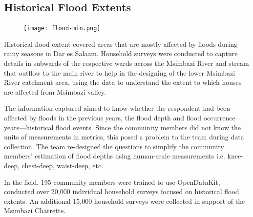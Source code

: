 \documentclass[a4paper,12pt,twoside]{article}
\begin{document}

\newpage
\subsection{Historical Flood Extents}
\begin{figure}[h]
    \centering
    \texttt{[image: flood-min.png]}
    \label{fig:my_label}
\end{figure}

\begin{multicols}{2}
Historical flood extent covered areas that are mostly affected by floods during rainy seasons in Dar es Salaam. Household surveys were conducted to capture details in subwards of the respective wards across the Msimbazi River and stream that outflow to the main river to help in the designing of the lower Msimbazi River catchment area, using the data to understand the extent to which houses are affected from Msimbazi valley.

The information captured aimed to know whether the respondent had been affected by floods in the previous years, the flood depth and flood occurrence years---historical flood events. Since the community members did not know the units of measurements in metrics, this posed a problem to the team during data collection. The team re-designed the questions to simplify the community members’ estimation of flood depths using human-scale measurements i.e. knee-deep, chest-deep, waist-deep, etc.

In the field, 195 community members were trained to use OpenDataKit, conducted over 20,000 individual household surveys focused on historical flood extents. An additional 15,000 household surveys were collected in support of the Msimbazi Charrette. 
\end{multicols}

\newpage

\end{document}
\end{multicols}
\end{document}
